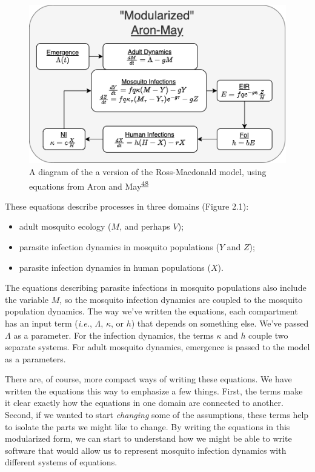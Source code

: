 \documentclass[
]{book}
\begin{document}
\begin{figure}
\centering
\includegraphics{Figures/AronMay.png}
\caption{A diagram of the a version of the Ross-Macdonald model, using equations from Aron and May\textsuperscript{\protect\hyperlink{ref-AronJL1982PopulationDynamics}{48}}}
\end{figure}

These equations describe processes in three domains (Figure 2.1):

\begin{itemize}
\item
  adult mosquito ecology (\(M\), and perhaps \(V\));
\item
  parasite infection dynamics in mosquito populations (\(Y\) and \(Z\));
\item
  parasite infection dynamics in human populations (\(X\)).
\end{itemize}

The equations describing parasite infections in mosquito populations also include the variable \(M\), so the mosquito infection dynamics are coupled to the mosquito population dynamics. The way we've written the equations, each compartment has an input term (\emph{i.e.}, \(\Lambda\), \(\kappa\), or \(h\)) that depends on something else. We've passed \(\Lambda\) as a parameter. For the infection dynamics, the terms \(\kappa\) and \(h\) couple two separate systems. For adult mosquito dynamics, emergence is passed to the model as a parameters.

There are, of course, more compact ways of writing these equations. We have written the equations this way to emphasize a few things. First, the terms make it clear exactly how the equations in one domain are connected to another. Second, if we wanted to start \emph{changing} some of the assumptions, these terms help to isolate the parts we might like to change. By writing the equations in this modularized form, we can start to understand how we might be able to write software that would allow us to represent mosquito infection dynamics with different systems of equations.
\end{document}
